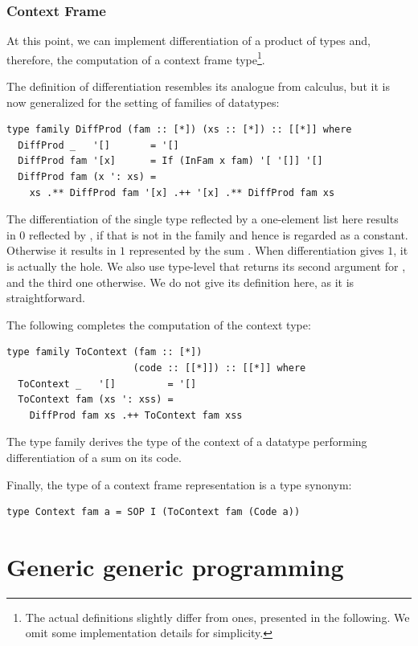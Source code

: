 \documentclass[sigplan,screen,review,anonymous]{acmart}
\begin{document}
\subsubsection{Context Frame}

At this point, we can implement differentiation of a product of types and, therefore, the computation of a context frame type\footnote{The actual definitions slightly differ from ones, presented in the following. We omit some implementation details for simplicity.}. 

The definition of differentiation resembles its analogue from calculus, but it is now generalized for the setting of families of datatypes:
\begin{lstlisting}[style=fancy]
type family DiffProd (fam :: [*]) (xs :: [*]) :: [[*]] where
  DiffProd _   '[]       = '[]
  DiffProd fam '[x]      = If (InFam x fam) '[ '[]] '[]
  DiffProd fam (x ': xs) =
    xs .** DiffProd fam '[x] .++ '[x] .** DiffProd fam xs
\end{lstlisting}
The differentiation of the single type reflected by a one-element list here results in $0$ reflected by , if that is not in the family and hence is regarded as a constant. Otherwise it results in $1$ represented by the sum . When differentiation gives $1$, it is actually the hole. We also use type-level  that returns its second argument for , and the third one otherwise. We do not give its definition here, as it is straightforward.

The following completes the computation of the context type:
\begin{lstlisting}[style=fancy]
type family ToContext (fam :: [*])
                      (code :: [[*]]) :: [[*]] where
  ToContext _   '[]         = '[]
  ToContext fam (xs ': xss) =
    DiffProd fam xs .++ ToContext fam xss
\end{lstlisting}
The type family  derives the type of the context of a datatype performing differentiation of a sum on its code.

Finally, the type of a context frame representation is a type synonym:
\begin{lstlisting}[style=fancy]
type Context fam a = SOP I (ToContext fam (Code a))
\end{lstlisting}


\section{Generic generic programming}
\label{sec:ggp}
\end{document}
